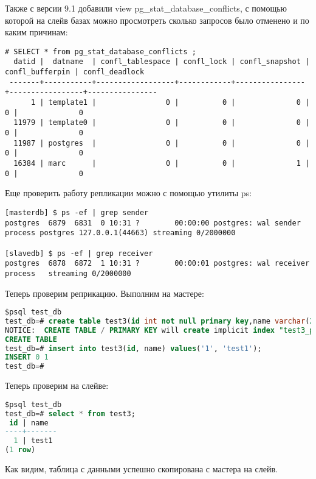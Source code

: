 Также с версии 9.1 добавили view pg\_stat\_database\_conflicts, с помощью которой на слейв базах можно просмотреть сколько запросов было отменено и по каким причинам:

\begin{lstlisting}[label=lst:streaming152,caption=Состояние слейва]
# SELECT * from pg_stat_database_conflicts ;
  datid |  datname  | confl_tablespace | confl_lock | confl_snapshot | confl_bufferpin | confl_deadlock 
 -------+-----------+------------------+------------+----------------+-----------------+----------------
      1 | template1 |                0 |          0 |              0 |               0 |              0
  11979 | template0 |                0 |          0 |              0 |               0 |              0
  11987 | postgres  |                0 |          0 |              0 |               0 |              0
  16384 | marc      |                0 |          0 |              1 |               0 |              0
\end{lstlisting}

Еще проверить работу репликации можно с помощью утилиты ps:
\begin{lstlisting}[label=lst:streaming16,caption=Тестирование репликации]
[masterdb] $ ps -ef | grep sender
postgres  6879  6831  0 10:31 ?        00:00:00 postgres: wal sender process postgres 127.0.0.1(44663) streaming 0/2000000

[slavedb] $ ps -ef | grep receiver
postgres  6878  6872  1 10:31 ?        00:00:01 postgres: wal receiver process   streaming 0/2000000
\end{lstlisting}

Теперь проверим реприкацию. Выполним на мастере:
\begin{lstlisting}[language=SQL,label=lst:streaming17,caption=Выполняем на мастере]
$psql test_db
test_db=# create table test3(id int not null primary key,name varchar(20));
NOTICE:  CREATE TABLE / PRIMARY KEY will create implicit index "test3_pkey" for table "test3"
CREATE TABLE
test_db=# insert into test3(id, name) values('1', 'test1');
INSERT 0 1
test_db=#
\end{lstlisting}

Теперь проверим на слейве:
\begin{lstlisting}[language=SQL,label=lst:streaming18,caption=Выполняем на слейве]
$psql test_db
test_db=# select * from test3;
 id | name  
----+-------
  1 | test1
(1 row)
\end{lstlisting}

Как видим, таблица с данными успешно скопирована с мастера на слейв. 

